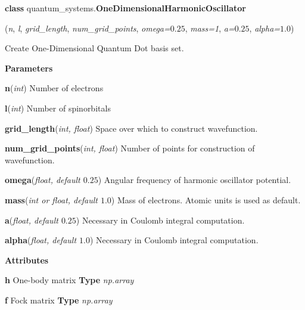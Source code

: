 \begin{tcolorbox}
    {\selectfont
    \textbf{class} quantum\_systems.\textbf{OneDimensionalHarmonicOscillator}

    \hspace{1em}(\emph{n}, \emph{l}, \emph{grid\_length}, \emph{num\_grid\_points}, 
    \emph{omega=$0.25$}, \emph{mass=1}, \emph{a=$0.25$}, \emph{alpha=$1.0$})

    \vspace{1em}
    Create One-Dimensional Quantum Dot basis set.
    \vspace{1em}

    \textbf{Parameters}

    \hspace{2em}\textbf{n}(\emph{int}) Number of electrons
    
    \hspace{2em}\textbf{l}(\emph{int}) Number of spinorbitals
    
    \hspace{2em}\textbf{grid\_length}(\emph{int, float}) Space over which to 
        construct wavefunction.
    
    \hspace{2em}\textbf{num\_grid\_points}(\emph{int, float}) Number of 
        points for construction of wavefunction.

    \hspace{2em}\textbf{omega}(\emph{float, default $0.25$}) Angular frequency of
        harmonic oscillator potential.
    
    \hspace{2em}\textbf{mass}(\emph{int or float, default $1.0$}) Mass of electrons.
        Atomic units is used as default.
    
    \hspace{2em}\textbf{a}(\emph{float, default $0.25$}) Necessary in Coulomb 
        integral computation.
    
    \hspace{2em}\textbf{alpha}(\emph{float, default $1.0$}) Necessary in Coulomb 
        integral computation.

    \vspace{1em}
    \textbf{Attributes}

    \hspace{2em} \textbf{h}
    One-body matrix 
    \textbf{Type} \emph{np.array}
    
    \hspace{2em} \textbf{f}
    Fock matrix
    \textbf{Type} \emph{np.array}

}
\end{tcolorbox}
